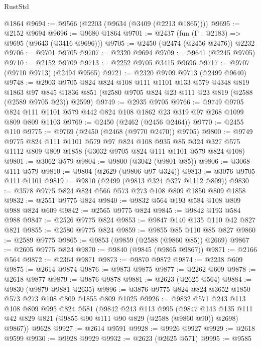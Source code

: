 \begin{lexlean}{RustStd}
\begin{coremodule}
    @1864
@9694 := @9566 (@2203 (@9634 (@3409 (@2213 @1865))))
@9695 := @2152 @9694
@9696 := @9680 @1864
@9701 := @2437 (fun (Γ : @2183) => @9695 (@9643 (@3416 @9696)))
@9705 := @2450 (@2474 (@2456 @2476)) @2232
@9706 := @9701 @9705
@9707 := @2320 @9694
@9709 := @9641 (@2245 @9705)
@9710 := @2152 @9709
@9713 := @2252 @9705 @3415 @9696
@9717 := @9707 (@9710 @9713) (@2494 @9565)
@9721 := @2320 @9709 @9713 (@2499 @9640)
@9748 := @2903
    @9705
    @824
    @824
    @108
    @111
    @1101
    @133
    @579
    @4348
    @819
    @1863
    @97
    @845
    @1836
    @851
    (@2580 @9705 @824 @23 @111 @23 @819 (@2588 (@2589 @9705 @23)) @2599)
@9749 := @2935 @9705
@9766 := @9749
    @9705
    @824
    @111
    @1101
    @579
    @442
    @824
    @108
    @1862
    @23
    @319
    @97
    @268
    @1099
    @809
    @809
    @1103
@9769 := @2450 (@2462 (@2456 @2464))
@9770 := @2455 @110
@9775 := @9769 (@2450 (@2468 (@9770 @2470)) @9705)
@9800 := @9749
    @9775
    @824
    @111
    @1101
    @579
    @97
    @824
    @108
    @935
    @85
    @324
    @327
    @575
    @1112
    @809
    @809
    @1858
    (@3032 @9705 @824 @111 @1101 @579 @824 @108)
@9801 := @3062 @579
@9804 := @9800 (@3042 (@9801 @85))
@9806 := @3068 @111 @579
@9810 := @9804 (@2629 (@9806 @97 @324))
@9813 := @3076 @9705 @111 @1101
@9819 := @9810 (@2499 (@9813 @324 @327 @1112 @809))
@9830 := @3578 @9775 @824 @824 @566 @573 @273 @108 @809 @1850 @809 @1858
@9832 := @2551 @9775 @824
@9840 := @9832 @564 @193 @584 @108 @809 @988 @824 @609
@9842 := @2565 @9775 @824
@9845 := @9842 @193 @584 @988
@9847 := @2526 @9775 @824
@9853 := @9847 @140 @135 @110 @42 @827 @821
@9855 := @2580 @9775 @824
@9859 := @9855 @85 @110 @85 @827
@9860 := @2589 @9775
@9865 := @9853 (@9859 (@2588 (@9860 @85)) @2669)
@9867 := @2605 @9775 @824
@9870 := @9840 (@9845 (@9865 @9867))
@9871 := @2166 @564
@9872 := @2364 @9871
@9873 := @9870 @9872
@9874 := @2238 @609
@9875 := @2614 @9874
@9876 := @9873 @9875
@9877 := @2262 @609
@9878 := @2618 @9877
@9879 := @9876 @9878
@9881 := @2623 (@2625 @564)
@9884 := @9830 (@9879 @9881 @2635)
@9896 := @3876 @9775 @824 @824 @3652 @1850 @573 @273 @108 @809 @1855 @809 @1025
@9926 := @9832
    @571
    @243
    @113
    @108
    @809
    @995
    @824
    @581
    (@9842
      @243
      @113
      @995
      (@9847
        @143
        @135
        @111
        @42
        @829
        @821
        (@9855 @90 @111 @90 @829 (@2588 (@9860 @90)) @2698)
        @9867))
    @9628
@9927 := @2614 @9591
@9928 := @9926 @9927
@9929 := @2618 @9599
@9930 := @9928 @9929
@9932 := @2623 (@2625 @571)
@9995 := @9585

\end{coremodule}
\end{lexlean}
